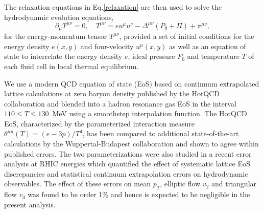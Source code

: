 \documentclass[aps,prc,reprint,amsmath,nofootinbib]{revtex4-1}
\begin{document}
The relaxation equations in Eq.\eqref{relaxation} are then used to solve the hydrodynamic evolution equations,
\begin{equation}
    \label{conservation}
    \partial_\mu T^{\mu\nu} = 0, \quad T^{\mu\nu} = e u^\mu u^\nu  - \Delta^{\mu\nu} (P_0 + \Pi) + \pi^{\mu\nu},
\end{equation}
for the energy-momentum tensor $T^{\mu\nu}$, provided a set of initial conditions for the energy density $e(x,y)$ and four-velocity $u^\mu(x,y)$ as well as an equation of state to interrelate the energy density $e$, ideal pressure $P_0$ and temperature $T$ of each fluid cell in local thermal equilibrium.

We use a modern QCD equation of state (EoS) based on continuum extrapolated lattice calculations at zero baryon density published by the HotQCD collaboration and blended into a hadron resonance gas EoS in the interval $110 \le T \le 130$~MeV using a smoothstep interpolation function.
The HotQCD EoS, characterized by the parameterized interaction measure $\theta^{\mu\mu}(T) = (e - 3p)/T^4$, has been compared to additional state-of-the-art calculations by the Wuppertal-Budapest collaboration and shown to agree within published errors.
The two parameterizations were also studied in a recent error analysis at RHIC energies which quantified the effect of systematic lattice EoS discrepancies and statistical continuum extrapolation errors on hydrodynamic observables.
The effect of these errors on mean $p_T$, elliptic flow $v_2$ and triangular flow $v_3$ was found to be order 1\% and hence is expected to be negligible in the present analysis.
\end{document}
